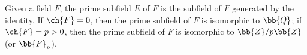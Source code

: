 \begin{exmp}
    Given a field $F$, the prime subfield $E$ of $F$ is the subfield of $F$ generated by the identity.
    If $\ch{F}=0$, then the prime subfield of $F$ is isomorphic to $\bb{Q}$; if $\ch{F}=p>0$, then the prime subfield of $F$ is isomorphic to $\bb{Z}/p\bb{Z}$ (or $\bb{F}_p$).
\end{exmp}